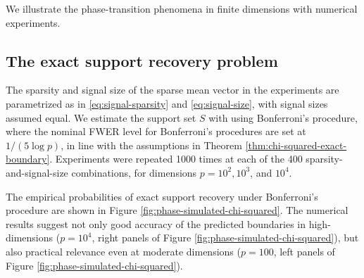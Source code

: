 
We illustrate the phase-transition phenomena in finite dimensions with numerical experiments.

\subsection{The exact support recovery problem}

The sparsity and signal size of the sparse mean vector in the experiments are parametrized as in \eqref{eq:signal-sparsity} and \eqref{eq:signal-size}, with signal sizes assumed equal.
We estimate the support set $S$ with using Bonferroni's procedure, where the nominal FWER level for Bonferroni's procedures are set at $1/(5{\log{p}})$, in line with the assumptions in Theorem \ref{thm:chi-squared-exact-boundary}.
Experiments were repeated 1000 times at each of the 400 sparsity-and-signal-size combinations, for dimensions $p=10^2, 10^3$, and $10^4$.

The empirical probabilities of exact support recovery under Bonferroni's procedure are shown in Figure \ref{fig:phase-simulated-chi-squared}.
The numerical results suggest not only good accuracy of the predicted boundaries in high-dimensions ($p=10^4$, right panels of Figure \ref{fig:phase-simulated-chi-squared}), but also practical relevance even at moderate dimensions ($p=100$, left panels of Figure \ref{fig:phase-simulated-chi-squared}).

